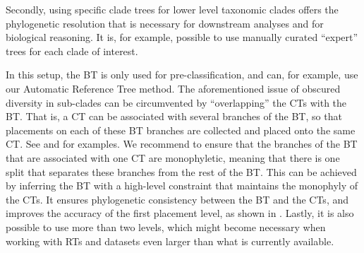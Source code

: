
Secondly, using specific clade trees for lower level taxonomic clades offers the phylogenetic resolution
that is necessary for downstream analyses and for biological reasoning.
It is, for example, possible to use manually curated ``expert'' trees for each clade of interest.

In this setup, the \ac{BT} is only used for pre-classification,
and can, for example, use our Automatic Reference Tree method.
The aforementioned issue of obscured diversity in sub-clades can be circumvented
by ``overlapping'' the \acp{CT} with the \ac{BT}.
That is, a \ac{CT} can be associated with several branches of the \ac{BT},
so that placements on each of these \ac{BT} branches are collected and placed onto the same \ac{CT}.
See  and  for examples.
We recommend to ensure that the branches of the \ac{BT} that are associated with one \ac{CT} are monophyletic,
meaning that there is one split that separates these branches from the rest of the \ac{BT}.
This can be achieved by inferring the \ac{BT} with a high-level constraint that maintains the monophyly of the \acp{CT}.
It ensures phylogenetic consistency between the \ac{BT} and the \acp{CT},
and improves the accuracy of the first placement level, as shown in .
Lastly, it is also possible to use more than two levels,
which might become necessary when working with \acp{RT} and datasets even larger than what is currently available.

